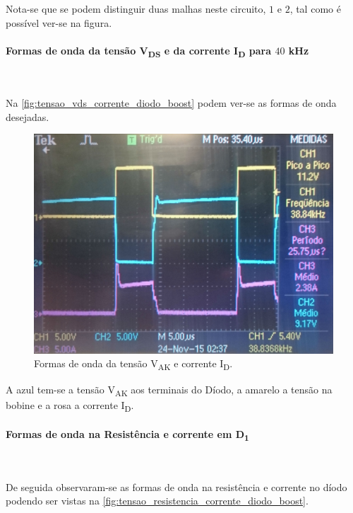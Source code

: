 \documentclass[a4paper,11pt]{article}
\numberwithin{equation}{section}
\begin{document}
Nota-se que se podem distinguir duas malhas neste circuito, $1$ e $2$, tal como é possível ver-se na figura.

\paragraph{Formas de onda da tensão V\textsubscript{DS} e da corrente I\textsubscript{D} para $40$ kHz}\mbox{}\

Na \autoref{fig:tensao_vds_corrente_diodo_boost} podem ver-se as formas de onda desejadas.

\begin{figure}[H]
	\centering
	\includegraphics[keepaspectratio=true, scale=0.13]{img/figs/tensao_vds_corrente_diodo_boost}
	\caption{Formas de onda da tensão V\textsubscript{AK} e corrente I\textsubscript{D}.}
	\label{fig:tensao_vds_corrente_diodo_boost}
	\vspace{-0.8em}
\end{figure}

A azul tem-se a tensão V\textsubscript{AK} aos terminais do Díodo, a amarelo a tensão na bobine e a rosa a corrente I\textsubscript{D}.

\paragraph{Formas de onda na Resistência e corrente em D\textsubscript{1}}\mbox{}\

De seguida observaram-se as formas de onda na resistência e corrente no díodo podendo ser vistas na \autoref{fig:tensao_resistencia_corrente_diodo_boost}.
\end{document}
